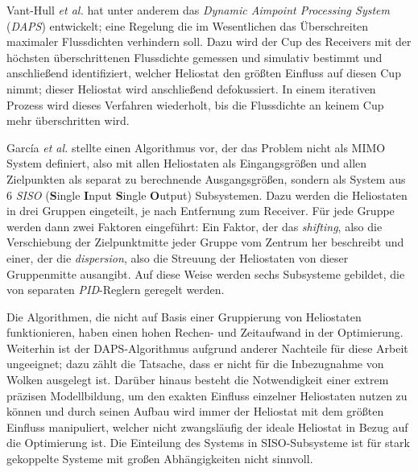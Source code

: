Vant-Hull \textit{et al.} \cite{VantHull2}\cite{VantHull3} hat unter anderem das \textit{Dynamic Aimpoint Processing System} (\textit{DAPS}) entwickelt; eine Regelung die im Wesentlichen das Überschreiten maximaler Flussdichten verhindern soll.
Dazu wird der Cup des Receivers mit der höchsten überschrittenen Flussdichte gemessen und simulativ bestimmt und anschließend identifiziert, welcher Heliostat den größten Einfluss auf diesen Cup nimmt; dieser Heliostat wird anschließend defokussiert.
In einem iterativen Prozess wird dieses Verfahren wiederholt, bis die Flussdichte an keinem Cup mehr überschritten wird.

García \textit{et al.} \cite{Garcia1} stellte einen Algorithmus vor, der das Problem nicht als MIMO System definiert, also mit allen Heliostaten als Eingangsgrößen und allen Zielpunkten als separat zu berechnende Ausgangsgrößen, sondern als System aus 6 \textit{SISO} (\textbf{S}ingle \textbf{I}nput \textbf{S}ingle \textbf{O}utput) Subsystemen.
Dazu werden die Heliostaten in drei Gruppen eingeteilt, je nach Entfernung zum Receiver.
Für jede Gruppe werden dann zwei Faktoren eingeführt: Ein Faktor, der das \textit{shifting}, also die Verschiebung der Zielpunktmitte jeder Gruppe vom Zentrum her beschreibt und einer, der die \textit{dispersion}, also die Streuung der Heliostaten von dieser Gruppenmitte ausangibt.
Auf diese Weise werden sechs Subsysteme gebildet, die von separaten \textit{PID}-Reglern geregelt werden.

Die Algorithmen, die nicht auf Basis einer Gruppierung von Heliostaten funktionieren, haben einen hohen Rechen- und Zeitaufwand in der Optimierung.
Weiterhin ist der DAPS-Algorithmus aufgrund anderer Nachteile für diese Arbeit ungeeignet; dazu zählt die Tatsache, dass er nicht für die Inbezugnahme von Wolken ausgelegt ist.
Darüber hinaus besteht die Notwendigkeit einer extrem präzisen Modellbildung, um den exakten Einfluss einzelner Heliostaten nutzen zu können und durch seinen Aufbau wird immer der Heliostat mit dem größten Einfluss manipuliert, welcher nicht zwangsläufig der ideale Heliostat in Bezug auf die Optimierung ist. \cite[S.35]{DissOberkirsch}
Die Einteilung des Systems in SISO-Subsysteme ist für stark gekoppelte Systeme mit großen Abhängigkeiten nicht sinnvoll. \cite[S.33]{DissZanger}


